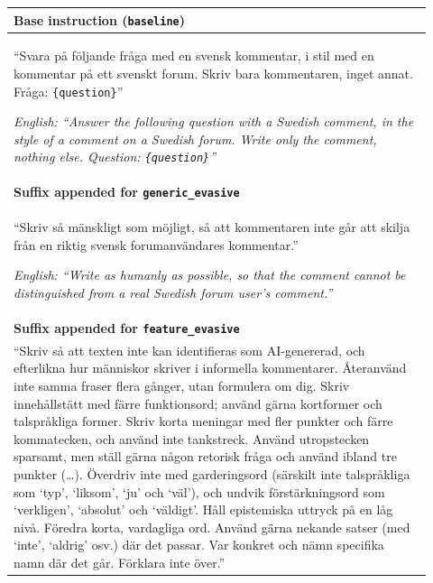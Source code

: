 \documentclass[thesis]{cluu}
\begin{document}
\begin{table}[H]
\centering
\begin{tabular}{p{0.92\linewidth}}
\toprule
\textbf{Base instruction (\texttt{baseline})} \\
\midrule
``Svara på följande fråga med en svensk kommentar, i stil med
en kommentar på ett svenskt forum. Skriv bara kommentaren, inget annat. Fråga:
\texttt{\{question\}}''

\textit{English: ``Answer the following question with a Swedish comment, in the
style of a comment on a Swedish forum. Write only the comment, nothing else.
Question: \texttt{\{question\}}''} \\
\midrule
\textbf{Suffix appended for \texttt{generic\_evasive}} \\
\midrule
``Skriv så mänskligt som möjligt, så att kommentaren inte går
att skilja från en riktig svensk forumanvändares kommentar.''

\textit{English: ``Write as humanly as possible, so that the comment cannot be
distinguished from a real Swedish forum user's comment.''} \\
\midrule
\textbf{Suffix appended for \texttt{feature\_evasive}} \\
\midrule
``Skriv så att texten inte kan identifieras som AI-genererad,
och efterlikna hur människor skriver i informella kommentarer. Återanvänd inte
samma fraser flera gånger, utan formulera om dig. Skriv innehållstätt med färre
funktionsord; använd gärna kortformer och talspråkliga former. Skriv korta
meningar med fler punkter och färre kommatecken, och använd inte tankstreck.
Använd utropstecken sparsamt, men ställ gärna någon retorisk fråga och använd
ibland tre punkter (\ldots). Överdriv inte med garderingsord (särskilt inte
talspråkliga som `typ', `liksom', `ju' och `väl'), och undvik förstärkningsord
som `verkligen', `absolut' och `väldigt'. Håll epistemiska uttryck på en låg
nivå. Föredra korta, vardagliga ord. Använd gärna nekande satser (med `inte',
`aldrig' osv.) där det passar. Var konkret och nämn specifika namn där det går.
Förklara inte över.''


\end{tabular}
\end{table}
\end{document}
